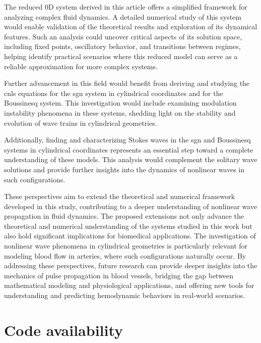 \documentclass[alpha-refs, 12pt]{wiley-article}
\begin{document}
The reduced 0D system derived in this article offers a simplified framework for analyzing complex fluid dynamics. A detailed numerical study of this system would enable validation of the theoretical results and exploration of its dynamical features. Such an analysis could uncover critical aspects of its solution space, including fixed points, oscillatory behavior, and transitions between regimes, helping identify practical scenarios where this reduced model can serve as a reliable approximation for more complex systems.

Further advancement in this field would benefit from deriving and studying the \acrfull{cnls} equations for the \acrshort{sgn} system in cylindrical coordinates and for the Boussinesq system. This investigation would include examining modulation instability phenomena in these systems, shedding light on the stability and evolution of wave trains in cylindrical geometries.

Additionally, finding and characterizing Stokes waves in the \acrshort{sgn} and Boussinesq systems in cylindrical coordinates represents an essential step toward a complete understanding of these models. This analysis would complement the solitary wave solutions and provide further insights into the dynamics of nonlinear waves in such configurations.

These perspectives aim to extend the theoretical and numerical framework developed in this study, contributing to a deeper understanding of nonlinear wave propagation in fluid dynamics. The proposed extensions not only advance the theoretical and numerical understanding of the systems studied in this work but also hold significant implications for biomedical applications. The investigation of nonlinear wave phenomena in cylindrical geometries is particularly relevant for modeling blood flow in arteries, where such configurations naturally occur. By addressing these perspectives, future research can provide deeper insights into the mechanics of pulse propagation in blood vessels, bridging the gap between mathematical modeling and physiological applications, and offering new tools for understanding and predicting hemodynamic behaviors in real-world scenarios.

\vspace*{1.5em}

\section*{Code availability}
\end{document}
